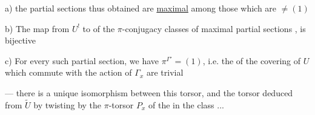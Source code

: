  a)  the partial sections thus obtained are \uline{maximal} among those which are $\ne(1)$

 b) The map from $U^!$ to  of the $\pi$-conjugacy classes of maximal partial sections  , is bijective


 c) For every such partial section, we have $\pi^{\Gamma'}=(1)$, i.e. the   of the  covering  of $U$ which commute with the action of $\Gamma_x$ are trivial

--- there is a unique isomorphism  between this torsor, and the torsor deduced from $\widetilde U$ by twisting by the $\pi$-torsor  $P_x$ of the  in the class  \unsure{$[\Gamma']$}...

